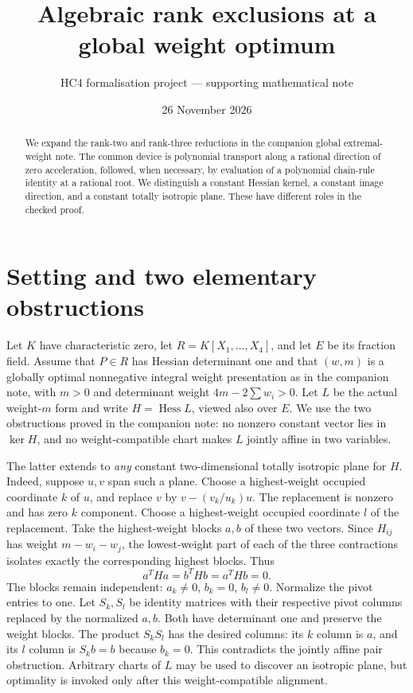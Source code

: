 \documentclass[11pt,a4paper]{article}
\title{Algebraic rank exclusions at a global weight optimum}
\author{HC4 formalisation project --- supporting mathematical note}
\date{26 November 2026}
\newcommand{\Hess}{\operatorname{Hess}}
\begin{document}
\maketitle
\begin{abstract}
We expand the rank-two and rank-three reductions in the companion global extremal-weight note. The common device is polynomial transport along a rational direction of zero acceleration, followed, when necessary, by evaluation of a polynomial chain-rule identity at a rational root. We distinguish a constant Hessian kernel, a constant image direction, and a constant totally isotropic plane. These have different roles in the checked proof.
\end{abstract}

\section{Setting and two elementary obstructions}
Let $K$ have characteristic zero, let $R=K[X_1,\ldots,X_4]$, and let $E$ be its fraction field. Assume that $P\in R$ has Hessian determinant one and that $(w,m)$ is a globally optimal nonnegative integral weight presentation as in the companion note, with $m>0$ and determinant weight $4m-2\sum w_i>0$. Let $L$ be the actual weight-$m$ form and write $H=\Hess L$, viewed also over $E$. We use the two obstructions proved in the companion note: no nonzero constant vector lies in $\ker H$, and no weight-compatible chart makes $L$ jointly affine in two variables.

The latter extends to \emph{any} constant two-dimensional totally isotropic plane for $H$. Indeed, suppose $u,v$ span such a plane. Choose a highest-weight occupied coordinate $k$ of $u$, and replace $v$ by $v-(v_k/u_k)u$. The replacement is nonzero and has zero $k$ component. Choose a highest-weight occupied coordinate $l$ of the replacement. Take the highest-weight blocks $a,b$ of these two vectors. Since $H_{ij}$ has weight $m-w_i-w_j$, the lowest-weight part of each of the three contractions isolates exactly the corresponding highest blocks. Thus
\[
 a^THa=b^THb=a^THb=0.
\]
The blocks remain independent: $a_k\ne0$, $b_k=0$, $b_l\ne0$. Normalize the pivot entries to one. Let $S_k,S_l$ be identity matrices with their respective pivot columns replaced by the normalized $a,b$. Both have determinant one and preserve the weight blocks. The product $S_kS_l$ has the desired columns: its $k$ column is $a$, and its $l$ column is $S_kb=b$ because $b_k=0$. This contradicts the jointly affine pair obstruction. Arbitrary charts of $L$ may be used to discover an isotropic plane, but optimality is invoked only after this weight-compatible alignment.
\end{document}
